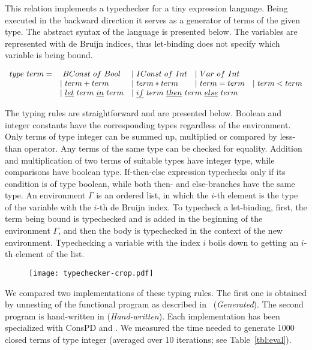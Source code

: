 This relation implements a typechecker for a tiny expression language.
Being executed in the backward direction it serves as a generator of terms of the given type.
The abstract syntax of the language is presented below.
The variables are represented with de Bruijn indices, thus let-binding does not specify which variable is being bound.

\[\begin{array}{lllll}
  type \ term = &\ BConst \ of \ Bool &| \ IConst \ of \ Int &| \ Var \ of \ Int & \\
  & | \ term + term &| \ term * term &| \ term = term &| \ term < term \\
  &| \ \underline{let} \ term \ \underline{in} \ term
  &\multicolumn{2}{l}{| \ \underline{if} \ term \ \underline{then} \ term \ \underline{else} \ term} &
\end{array}\]

The typing rules are straightforward and are presented below.
Boolean and integer constants have the corresponding types regardless of the environment.
Only terms of type integer can be summed up, multiplied or compared by less-than operator.
Any terms of the same type can be checked for equality.
Addition and multiplication of two terms of suitable types have integer type, while comparisons have boolean type.
If-then-else expression typechecks only if its condition is of type boolean, while both then- and else-branches have the same type.
An environment $\Gamma$ is an ordered list, in which the $i$-th element is the type of the variable with the $i$-th de Bruijn index.
To typecheck a let-binding, first, the term being bound is typechecked and is added in the beginning of the environment $\Gamma$, and then the body is typechecked in the context of the new environment.
Typechecking a variable with the index $i$ boils down to getting an $i$-th element of the list.

\begin{figure*}[!h]
  \texttt{[image: typechecker-crop.pdf]}
\end{figure*}

We compared two implementations of these typing rules.
The first one is obtained by unnesting of the functional program as described in~\cite{lozov2019relational} (\emph{Generated}).
The second program is hand-written in \oc (\emph{Hand-written}).
Each implementation has been specialized with ConsPD and \ecce.
We measured the time needed to generate 1000 closed terms of type integer (averaged over 10 iterations; see Table~\ref{tbl:eval}).

